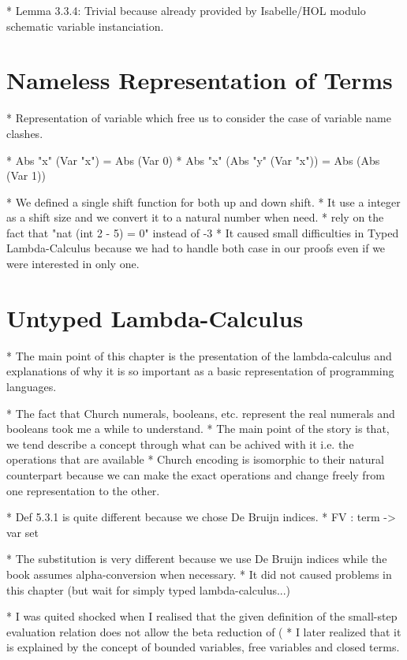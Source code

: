 \documentclass[a4paper, oneside, 12pt, titlepage]{article}
\begin{document}
  * Lemma 3.3.4: Trivial because already provided by Isabelle/HOL modulo schematic variable
    instanciation.

\section{Nameless Representation of Terms}
\label{sec:nameless-rep-of-terms}

  * Representation of variable which free us to consider the case of variable name clashes.

  * Abs "x" (Var "x") = Abs (Var 0)
  * Abs "x" (Abs "y" (Var "x")) = Abs (Abs (Var 1))

  * We defined a single shift function for both up and down shift.
    * It use a integer as a shift size and we convert it to a natural number when need.
      * rely on the fact that "nat (int 2 - 5) = 0" instead of -3
    * It caused small difficulties in Typed Lambda-Calculus because we had to handle both case in
      our proofs even if we were interested in only one.

\section{Untyped Lambda-Calculus}
\label{sec:untyped-lambda-calculus}

  * The main point of this chapter is the presentation of the lambda-calculus and explanations of
    why it is so important as a basic representation of programming languages.

  * The fact that Church numerals, booleans, etc. represent the real numerals and booleans took me a
    while to understand.
    * The main point of the story is that, we tend describe a concept through what can be achived
      with it i.e. the operations that are available
    * Church encoding is isomorphic to their natural counterpart because we can make the exact
      operations and change freely from one representation to the other.

  * Def 5.3.1 is quite different because we chose De Bruijn indices.
    * FV : term -> var set

  * The substitution is very different because we use De Bruijn indices while the book assumes
    alpha-conversion when necessary.
    * It did not caused problems in this chapter (but wait for simply typed lambda-calculus...)

  * I was quited shocked when I realised that the given definition of the small-step evaluation
    relation does not allow the beta reduction of (%
    * I later realized that it is explained by the concept of bounded variables, free variables and
      closed terms.
\end{document}
